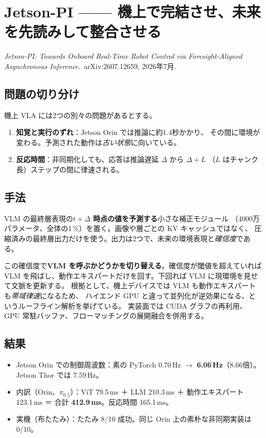 \documentclass[11pt,a4paper]{article}
\newcommand{\prob}[1]{\textbf{\textcolor{red!55!black}{#1}}}
\newcommand{\keyp}[1]{\textbf{\textcolor{blue!45!black}{#1}}}
\begin{document}
\section{Jetson-PI —— 機上で完結させ、未来を先読みして整合させる}
\label{sec:jetsonpi}

\noindent
\emph{Jetson-PI: Towards Onboard Real-Time Robot Control via Foresight-Aligned
Asynchronous Inference}.\ arXiv:2607.12659, 2026年7月.

\subsection*{問題の切り分け}

機上 VLA には2つの別々の問題があるとする。

\begin{enumerate}[leftmargin=1.6em,itemsep=2pt]
  \item \prob{知覚と実行のずれ}：Jetson Orin では推論に約1.4秒かかり、
        その間に環境が変わる。予測された動作は\emph{古い状態}に向いている。
  \item \prob{反応時間}：非同期化しても、応答は推論遅延 $\Delta$ から $\Delta+L$
        （$L$ はチャンク長）ステップの間に律速される。
\end{enumerate}

\subsection*{手法}

VLM の最終層表現の\keyp{$t+\Delta$ 時点の値を予測する}小さな補正モジュール
（4000万パラメータ、全体の1\,\%）を置く。画像や層ごとの KV キャッシュではなく、
圧縮済みの最終層出力だけを使う。出力は2つで、未来の環境表現と\emph{確信度}である。

この確信度で\keyp{VLM を呼ぶかどうかを切り替える}。確信度が閾値を超えていれば
VLM を飛ばし、動作エキスパートだけを回す。下回れば VLM に現環境を見せて文脈を更新する。
根拠として、機上デバイスでは VLM も動作エキスパートも\emph{帯域律速}になるため、
ハイエンド GPU と違って並列化が逆効果になる、というルーフライン解析を挙げている。
実装面では CUDA グラフの再利用、GPU 常駐バッファ、フローマッチングの展開融合を併用する。

\subsection*{結果}

\begin{itemize}[leftmargin=1.4em,itemsep=2pt]
  \item Jetson Orin での制御周波数：素の PyTorch 0.70\,Hz $\to$ \keyp{6.06\,Hz}（8.66倍）。
        Jetson Thor では 7.59\,Hz。
  \item 内訳（Orin、$\pi_{0.5}$）：ViT 79.5\,ms ＋ LLM 210.3\,ms ＋ 動作エキスパート 123.1\,ms
        ＝ 合計 \prob{412.9\,ms}。反応時間 165.1\,ms。
  \item 実機（布たたみ）：たたみ 8/10 成功。同じ Orin 上の素朴な非同期実装は 0/10。
\end{itemize}
\end{document}
